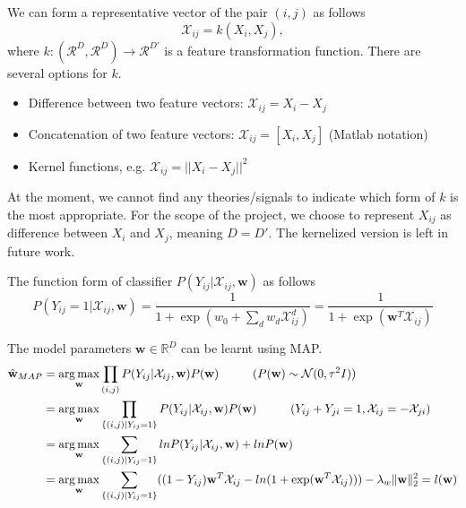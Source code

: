 We can form a representative vector of the pair $(i, j)$ as follows
	\begin{equation}
		\mathcal{X}_{ij} = k (X_i, X_j),
	\end{equation}
where $k: (\mathcal{R}^D, \mathcal{R}^D) \rightarrow \mathcal{R}^{D'}$ is a feature transformation function. There are several options for $k$. 
\begin{itemize}
	\item Difference between two feature vectors: $\mathcal{X}_{ij} = X_i - X_j$
	\item Concatenation of two feature vectors:  $\mathcal{X}_{ij} = [X_i, X_j]$ (Matlab notation)
	\item Kernel functions, e.g. $\mathcal{X}_{ij} = || X_i - X_j ||^2$
\end{itemize}
At the moment, we cannot find any theories/signals to indicate which form of $k$ is the most appropriate. For the scope of the project, we choose to represent $X_{ij}$ as difference between $X_i$ and $X_j$, meaning $D = D'$. The kernelized version is left in future work. 

The function form of classifier $P(Y_{ij}|\mathcal{X}_{ij}, \textbf{w})$ as follows
	 \begin{equation}
	 P(Y_{ij}=1|\mathcal{X}_{ij}, \textbf{w}) = \frac{1}{1 + \exp ( w_0 + \sum_d w_d \mathcal{X}_{ij}^d )} = \frac{1}{1 + \exp (\textbf{w}^T \mathcal{X}_{ij})}
	 \end{equation}
 
The model parameters $\textbf{w} \in \mathbb{R}^D$ can be learnt using MAP.
	\begin{align}
	\label{eqn:objFuncLR}
	\hat{\textbf{w}}_{MAP} &= \operatorname*{arg\,max}_{\textbf{w}} \prod_{(i,j)} P(Y_{ij}| \mathcal{X}_{ij}, \textbf{w}) P(\textbf{w}) \hspace{1 cm} \text{($P(\textbf{w}) \sim \mathcal{N} (0, \tau^2 I) $)}\\ \notag
	&= \operatorname*{arg\,max}_{\textbf{w}} \prod_{\{(i,j)|Y_{ij}=1\}} P(Y_{ij}| \mathcal{X}_{ij}, \textbf{w}) P(\textbf{w}) \hspace{1 cm} \text{($Y_{ij} + Y_{ji} = 1, \mathcal{X}_{ij} = - \mathcal{X}_{ji}$)}\\ \notag
	&= \operatorname*{arg\,max}_{\textbf{w}} \sum_{\{(i,j)|Y_{ij}=1\}} ln P(Y_{ij}| \mathcal{X}_{ij}, \textbf{w}) + ln P(\textbf{w}) \\ \notag
	&= \operatorname*{arg\,max}_{\textbf{w}} \sum_{\{(i,j)|Y_{ij}=1\}} ( (1 - Y_{ij})\textbf{w}^T\mathcal{X}_{ij} - ln(1 + \exp(\textbf{w}^T\mathcal{X}_{ij}))) - \lambda_w \|\textbf{w} \|^2_2 = l(\textbf{w})
	\end{align}

